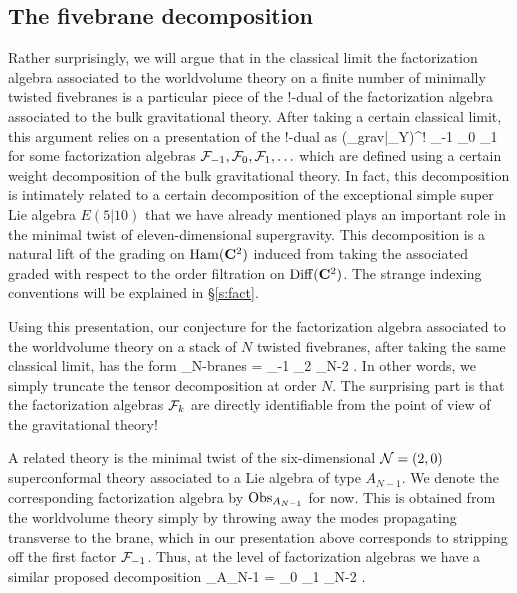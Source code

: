 \subsection{The fivebrane decomposition}
Rather surprisingly, we will argue that in the classical limit the factorization algebra associated to the worldvolume theory on a finite number of minimally twisted fivebranes is a particular piece of the $!$-dual of the factorization algebra associated to the bulk gravitational theory.
After taking a certain classical limit, this argument relies on a presentation of the $!$-dual as
\beqn
(\Obs_{grav}|_{Y})^{!} \simeq \cF_{-1} \otimes \cF_0 \otimes \cF_1 \otimes \cdots 
\eeqn
for some factorization algebras $\mathcal F_{-1},\mathcal F_0, \mathcal F_{1},\ldots$ which are defined using a certain weight decomposition of the bulk gravitational theory.
In fact, this decomposition is intimately related to a certain decomposition of the exceptional simple super Lie algebra $E(5|10)$ that we have already mentioned plays an important role in the minimal twist of eleven-dimensional supergravity. This decomposition is a natural lift of the grading on $\operatorname{Ham}(\mathbf{C}^{2})$ induced from taking the associated graded with respect to the order filtration on $\operatorname{Diff} (\mathbf{C}^{2})$. The strange indexing conventions will be explained in \S\ref{s:fact}.

Using this presentation, our conjecture for the factorization algebra associated to the worldvolume theory on a stack of $N$ twisted fivebranes, after taking the same classical limit, has the form
\beqn\label{eqn:finiteTensor}
\Obs_{N-branes} = \cF_{-1} \otimes \cF_2 \otimes \cdots \otimes \cF_{N-2} .
\eeqn
In other words, we simply truncate the tensor decomposition at order $N$.
The surprising part is that the factorization algebras $\mathcal F_k$ are directly identifiable from the point of view of the gravitational theory!

A related theory is the minimal twist of the six-dimensional $\mathcal N=(2,0)$ superconformal theory associated to a Lie algebra of type $A_{N-1}$.
We denote the corresponding factorization algebra by $\operatorname{Obs}_{A_{N-1}}$ for now. 
This is obtained from the worldvolume theory simply by throwing away the modes propagating transverse to the brane, which in our presentation above corresponds to stripping off the first factor $\mathcal F_{-1}$. 
Thus, at the level of factorization algebras we have a similar proposed decomposition
\beqn
\label{eqn:AN-1}
\Obs_{A_{N-1}} = \cF_0 \otimes \cF_1 \otimes \cdots \otimes \cF_{N-2} .
\eeqn

